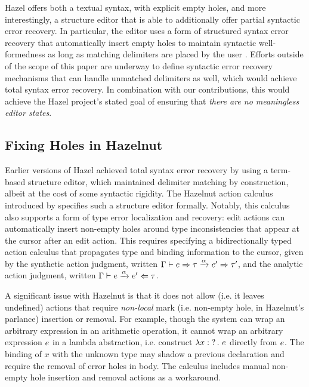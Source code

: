 Hazel offers both a textual syntax, with explicit empty holes, and more interestingly,
a structure editor that is able to additionally offer partial syntactic error recovery.
In particular, the  editor uses a form of structured syntax error recovery that automatically insert empty holes to maintain syntactic well-formedness as long as matching delimiters are placed by the user \cite{moon2022tylr,DBLP:conf/vl/Moon023}. Efforts outside of the scope of this paper are underway to define syntactic error recovery mechanisms that can handle unmatched delimiters as well, which would achieve total syntax error recovery. In combination with our contributions, this would achieve the Hazel project's stated goal of ensuring that \emph{there are no meaningless editor states}.


\subsection{Fixing Holes in Hazelnut}
\label{sec:calculus-hazelnut}

Earlier versions of Hazel achieved total syntax error recovery by using a term-based structure editor, which maintained delimiter matching by construction, albeit at the cost of some syntactic rigidity. The Hazelnut action calculus introduced by \citet{HazelnutPOPL} specifies such a structure editor formally. Notably, this calculus also supports a form of type error localization and recovery: edit actions can automatically insert non-empty holes around type inconsistencies that appear at the cursor after an edit action. This requires specifying a bidirectionally typed action calculus that propagates type and binding information to the cursor, given by the synthetic action judgment, written
$\Gamma \vdash e \Rightarrow \tau \xrightarrow{\alpha} e' \Rightarrow \tau'$, and the analytic action judgment, written
$\Gamma \vdash e \xrightarrow{\alpha} e' \Leftarrow \tau$.

A significant issue with Hazelnut is that it does not allow (i.e. it leaves undefined) actions that require \emph{non-local} mark (i.e. non-empty hole, in Hazelnut's parlance) insertion or removal. For
example, though the system can wrap an arbitrary expression in an arithmetic operation, it cannot
wrap an arbitrary expression $e$ in a lambda abstraction, i.e. construct
$\lambda x : \operatorname{?}. ~e$ directly from $e$. The binding of $x$ with the unknown type may
shadow a previous declaration and require the removal of error holes in body. The calculus includes manual non-empty hole insertion and removal actions as a workaround.


